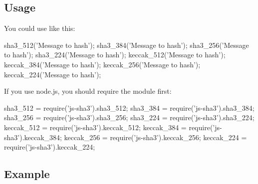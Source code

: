 \subsection*{Usage}

You could use like this\+: 
\begin{DoxyCode}
sha3\_512('Message to hash');
sha3\_384('Message to hash');
sha3\_256('Message to hash');
sha3\_224('Message to hash');
keccak\_512('Message to hash');
keccak\_384('Message to hash');
keccak\_256('Message to hash');
keccak\_224('Message to hash');
\end{DoxyCode}
 If you use node.\+js, you should require the module first\+: 
\begin{DoxyCode}
sha3\_512 = require('js-sha3').sha3\_512;
sha3\_384 = require('js-sha3').sha3\_384;
sha3\_256 = require('js-sha3').sha3\_256;
sha3\_224 = require('js-sha3').sha3\_224;
keccak\_512 = require('js-sha3').keccak\_512;
keccak\_384 = require('js-sha3').keccak\_384;
keccak\_256 = require('js-sha3').keccak\_256;
keccak\_224 = require('js-sha3').keccak\_224;
\end{DoxyCode}


\subsection*{Example}

